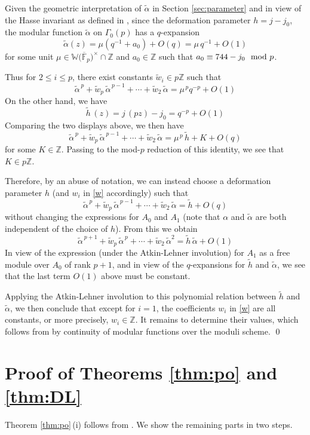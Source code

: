 \documentclass{gtpart}
\theoremstyle{definition}
\theoremstyle{remark}
\newcommand{\mb}[1]{\mathbb{#1}}
\newcommand{\cF}{\overline {\mb F}}
\newcommand{\BW}{{\mb W}}
\newcommand{\BZ}{{\mb Z}}
\newcommand{\tA}{\widetilde{\A}}
\renewcommand{\th}{\widetilde{h}}
\newcommand{\tw}{\widetilde{w}}
\newcommand{\md}{~~{\rm mod}~}
\newcommand{\A}{\alpha}
\newcommand{\G}{\Gamma}
\renewcommand{\=}{\approx}
\renewcommand{\-}{\sim}
\numberwithin{equation}{section}
\begin{document}
Given the geometric interpretation of $\tA$ in Section \ref{sec:parameter} and 
in view of the Hasse invariant as defined in \cite[12.4.1]{KM}, since the 
deformation parameter $h = j - j_0$, the modular function $\tA$ on $\G_0(p)$ has 
a $q$-expansion 
\[
 \tA(z) = \mu (q^{-1} + a_0) + O(q) = \mu \, q^{-1} + O(1) 
\]
for some unit $\mu \in \BW\big(\cF_p\big)^{\!\times} \!\cap \BZ$ and 
$a_0 \in \BZ$ such that $a_0 \equiv 744 - j_0 \md p$.  

Thus for $2 \leq i \leq p$, there exist constants $\tw_i \in p\BZ$ such that 
\[
 \tA^{\,p} + \tw_p \, \tA^{\,p - 1} + \cdots + \tw_2 \, \tA = \mu^{\,p} q^{-p} 
 + O(1) 
\]
On the other hand, we have 
\[
 \th\,(z) = j\,(p z) - j_0 = q^{-p} + O(1) 
\]
Comparing the two displays above, we then have 
\[
 \tA^{\,p} + \tw_p \, \tA^{\,p - 1} + \cdots + \tw_2 \, \tA = \mu^{\,p} \, \th 
 + K + O(q) 
\]
for some $K \in \BZ$.  Passing to the mod-$p$ reduction of this identity, we see 
that $K \in p\BZ$.  

Therefore, by an abuse of notation, we can instead choose a deformation 
parameter $h$ (and $w_i$ in \eqref{w} accordingly) such that 
\[
 \tA^{\,p} + \tw_p \, \tA^{\,p - 1} + \cdots + \tw_2 \, \tA = \th + O(q) 
\]
without changing the expressions for $A_0$ and $A_1$ (note that $\A$ and $\tA$ 
are both independent of the choice of $h$).  From this we obtain 
\[
 \tA^{\,p + 1} + \tw_p \, \tA^{\,p} + \cdots + \tw_2 \, \tA^2 = \th \, \tA 
 + O(1) 
\]
In view of the expression (under the Atkin-Lehner involution) for $A_1$ as a 
free module over $A_0$ of rank $p + 1$, and in view of the $q$-expansions for 
$\th$ and $\tA$, we see that the last term $O(1)$ above must be constant.  

Applying the Atkin-Lehner involution to this polynomial relation between $\th$ 
and $\tA$, we then conclude that except for $i = 1$, the coefficients $w_i$ in 
\eqref{w} are all constants, or more precisely, $w_i \in \BZ$.  It remains to 
determine their values, which follows from \cite[(3.26) and (3.27)]{ho} by 
continuity of modular functions over the moduli scheme.  \qed



\section{Proof of Theorems \ref{thm:po} and \ref{thm:DL}}

Theorem \ref{thm:po}\,(i) follows from \cite[Theorem 1.1]{Str98}.  We show the 
remaining parts in two steps.  
\end{document}
